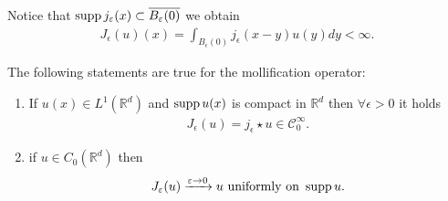 \begin{remark}
  Notice that $\operatorname*{supp} j_{\varepsilon}(x) \subset  \overline{B_{\varepsilon}(0)} $  we obtain 
  \begin{align*}
    J_{\epsilon}(u)(x) = \int_{B_{\epsilon}(0)}j_{\epsilon}(x-y)u(y) dy < \infty
  .\end{align*}
\end{remark}
\begin{lemma}The following statements are true for the mollification operator:
  \begin{enumerate}
    \item If $u(x) \in  L^{1}(\mathbb{R}^{d} ) $  and $\operatorname*{supp} u(x)$ is compact in $\mathbb{R}^{d} $ then $\forall  \epsilon > 0$ it holds
      \begin{align*}
        J_{\epsilon}(u) = j_{\epsilon} \star  u \in \mathcal{C}_0^{\infty}      .\end{align*}
    \item if $u \in  C_0(\mathbb{R}^{d} )$ then 
      \begin{align*}
        J_{\varepsilon}(u) \xrightarrow{\varepsilon \to 0} u \text{ uniformly on } \operatorname*{supp} u
      .\end{align*}
  \end{enumerate}
\end{lemma}
